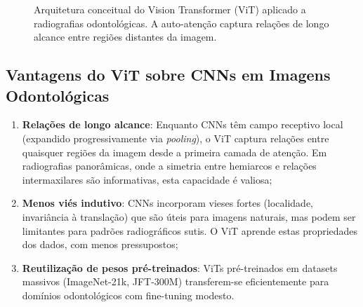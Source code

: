 \begin{figure}[H]
\centering
{}
\caption{Arquitetura conceitual do Vision Transformer (ViT) aplicado a radiografias odontológicas. A auto-atenção captura relações de longo alcance entre regiões distantes da imagem.}
\label{fig:vit-odontologia}
\end{figure}

\subsection{Vantagens do ViT sobre CNNs em Imagens Odontológicas}

\begin{enumerate}
    \item \textbf{Relações de longo alcance}: Enquanto CNNs têm campo receptivo local (expandido progressivamente via \textit{pooling}), o ViT captura relações entre quaisquer regiões da imagem desde a primeira camada de atenção. Em radiografias panorâmicas, onde a simetria entre hemiarcos e relações intermaxilares são informativas, esta capacidade é valiosa;

    \item \textbf{Menos viés indutivo}: CNNs incorporam vieses fortes (localidade, invariância à translação) que são úteis para imagens naturais, mas podem ser limitantes para padrões radiográficos sutis. O ViT aprende estas propriedades dos dados, com menos pressupostos;

    \item \textbf{Reutilização de pesos pré-treinados}: ViTs pré-treinados em datasets massivos (ImageNet-21k, JFT-300M) transferem-se eficientemente para domínios odontológicos com fine-tuning modesto.
\end{enumerate}

